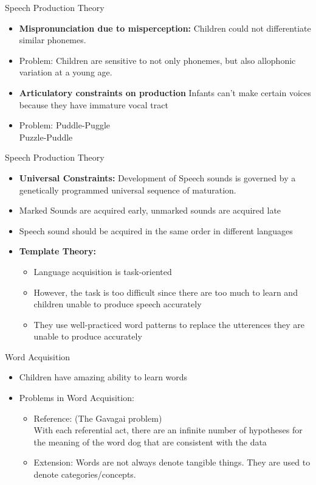 \documentclass{beamer}
\begin{document}
\begin{frame}{Speech Production Theory}
\begin{itemize}
    \item \textbf{Mispronunciation due to misperception:}
    \pause
    Children could not differentiate similar phonemes.
    \pause
    \item Problem: 
    \pause
     Children are sensitive to not only phonemes, but also allophonic variation at a young age.
     \item \textbf{Articulatory constraints on production}
     \pause 
     Infants can't make certain voices because they have immature vocal tract
     \item Problem:
     \pause
     Puddle-Puggle \\
     Puzzle-Puddle
\end{itemize}
\end{frame}
\begin{frame}{Speech Production Theory}
\begin{itemize}
    \item \textbf{Universal Constraints:}
    \pause
    Development of Speech sounds is governed by a genetically programmed universal sequence of maturation.
    \item Marked Sounds are acquired early, unmarked sounds are acquired late
    \item Speech sound should be acquired in the same order in different languages
    \item \textbf{Template Theory:}
    \begin{itemize}
        \item Language acquisition is task-oriented
        \item However, the task is too difficult since there are too much to learn and children unable to produce speech accurately 
        \item They use well-practiced word patterns to replace the utterences they are unable to produce accurately
    \end{itemize}
\end{itemize}
\end{frame}
\begin{frame}{Word Acquisition}
\begin{itemize}
    \item Children have amazing ability to learn words
    \item Problems in Word Acquisition:
    \begin{itemize}
        \item Reference: (The Gavagai problem)
        \pause \\ 
        With each referential act, there are an infinite number of hypotheses for the meaning of the word dog that are consistent with the data
        \pause
        \item Extension:
        \pause 
        Words are not always denote tangible things. They are used to denote categories/concepts.
    \end{itemize}
\end{itemize}
\end{frame}
\end{document}
